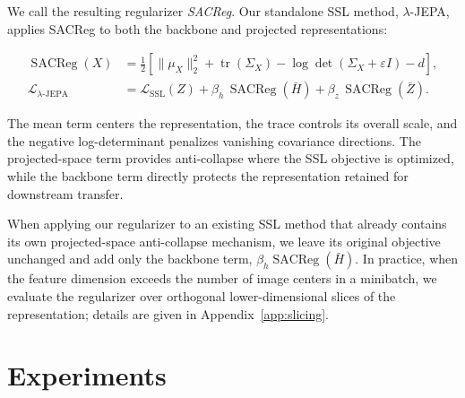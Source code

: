 \documentclass{article} %
\theoremstyle{remark}
\begin{document}
We call the resulting regularizer \emph{SACReg}. Our standalone SSL method,
\mbox{$\lambda$-JEPA}, applies SACReg to both the backbone and projected
representations:
\begin{tcolorbox}[
    colback=gray!14,
    colframe=black,
    boxrule=0.8pt,
    arc=2mm,
    left=3mm,
    right=3mm,
    top=1.5mm,
    bottom=1.5mm
]
\begin{equation}
\label{eq:lambda-jepa}
\begin{aligned}
\operatorname{SACReg}(X)
&=
\frac{1}{2}
\left[
\|\mu_X\|_2^2
+\operatorname{tr}(\Sigma_X)
-\log\det(\Sigma_X+\varepsilon I)
-d
\right], \\[2mm]
\mathcal L_{\lambda\text{-JEPA}}
&=
\mathcal L_{\mathrm{SSL}}(Z)
+\beta_h\,\operatorname{SACReg}(\bar H)
+\beta_z\,\operatorname{SACReg}(\bar Z).
\end{aligned}
\end{equation}
\end{tcolorbox}
The mean term centers the representation, the trace controls its overall scale, and the negative log-determinant penalizes vanishing covariance directions. 
The projected-space term provides anti-collapse where the SSL objective is optimized, while the backbone term directly protects the representation retained for downstream transfer.

When applying our regularizer to an existing SSL method that already contains its own projected-space anti-collapse mechanism, we leave its original objective unchanged and add only the backbone term,
$\beta_h\operatorname{SACReg}(\bar H)$.
In practice, when the feature dimension exceeds the number of image centers in a minibatch, we evaluate the regularizer over orthogonal lower-dimensional slices of the representation; details are given in Appendix~\ref{app:slicing}.





\section{Experiments}
\end{document}
